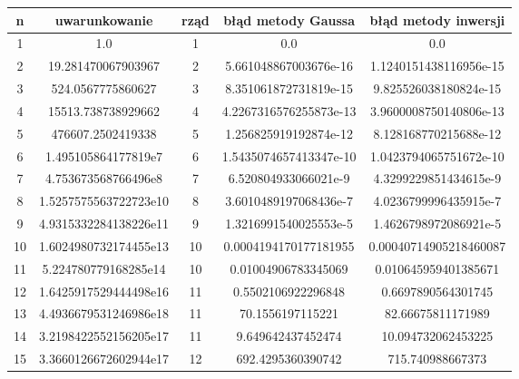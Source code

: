 \documentclass[15pt, a4paper]{article}
\begin{document}
\vspace{0.5cm}

\begin{table}[ht]
    \begin{adjustbox}{max width=\textwidth}
    \begin{tabular}{|c|c|c|c|c|}
        \hline 
        n & uwarunkowanie & rząd & błąd metody Gaussa & błąd metody inwersji \\ \hline
        1  & 1.0                & 1  & 0.0                           & 0.0                           \\ \hline
        2  & 19.281470067903967 & 2  & 5.661048867003676e-16         & 1.1240151438116956e-15       \\ \hline
        3  & 524.0567775860627  & 3  & 8.351061872731819e-15         & 9.825526038180824e-15        \\ \hline
        4  & 15513.738738929662 & 4  & 4.2267316576255873e-13        & 3.9600008750140806e-13       \\ \hline
        5  & 476607.2502419338  & 5  & 1.256825919192874e-12         & 8.128168770215688e-12        \\ \hline
        6  & 1.495105864177819e7 & 6  & 1.5435074657413347e-10       & 1.0423794065751672e-10       \\ \hline
        7  & 4.753673568766496e8 & 7  & 6.520804933066021e-9         & 4.3299229851434615e-9        \\ \hline
        8  & 1.5257575563722723e10 & 8 & 3.6010489197068436e-7       & 4.0236799996435915e-7        \\ \hline
        9  & 4.9315332284138226e11 & 9 & 1.3216991540025553e-5       & 1.4626798972086921e-5        \\ \hline
        10 & 1.6024980732174455e13 & 10 & 0.0004194170177181955      & 0.00040714905218460087       \\ \hline
        11 & 5.224780779168285e14  & 10 & 0.01004906783345069        & 0.010645959401385671         \\ \hline
        12 & 1.6425917529444498e16 & 11 & 0.5502106922296848         & 0.6697890564301745           \\ \hline
        13 & 4.4936679531246986e18 & 11 & 70.1556197115221           & 82.66675811171989            \\ \hline
        14 & 3.2198422552156205e17 & 11 & 9.649642437452474          & 10.094732062453225           \\ \hline
        15 & 3.3660126672602944e17 & 12 & 692.4295360390742          & 715.740988667373             \\ \hline

\end{tabular}
\end{adjustbox}
\end{table}
\end{document}
